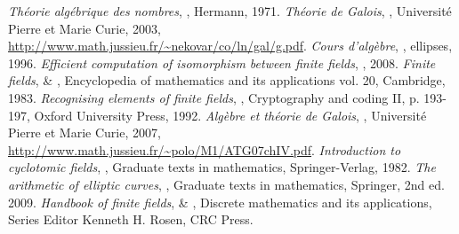 \documentclass[a4paper]{article} %
\numberwithin{equation}{section}
\begin{document}
\begin{thebibliography}{LC}
 \emph{Théorie algébrique des nombres}, , Hermann, 1971.
 \emph{Théorie de Galois}, , Université Pierre et Marie Curie, 2003,  \url{http://www.math.jussieu.fr/~nekovar/co/ln/gal/g.pdf}.
 \emph{Cours d'algèbre}, , ellipses, 1996.
 \emph{Efficient computation of isomorphism between finite fields}, , 2008.
 \emph{Finite fields},  \& , Encyclopedia of mathematics and its applications vol. 20, Cambridge, 1983.
 \emph{Recognising elements of finite fields}, , Cryptography and coding II, p. 193-197, Oxford University Press, 1992.
 \emph{Algèbre et théorie de Galois}, , Université Pierre et Marie Curie, 2007,  \url{http://www.math.jussieu.fr/~polo/M1/ATG07chIV.pdf}.
 \emph{Introduction to cyclotomic fields}, , Graduate texts in mathematics, Springer-Verlag, 1982.
 \emph{The arithmetic of elliptic curves}, , Graduate texts in mathematics, Springer, 2nd ed. 2009.
 \emph{Handbook of finite fields},  \& , Discrete mathematics and its applications, Series Editor Kenneth H. Rosen, CRC Press.
\end{thebibliography}
\end{document}
